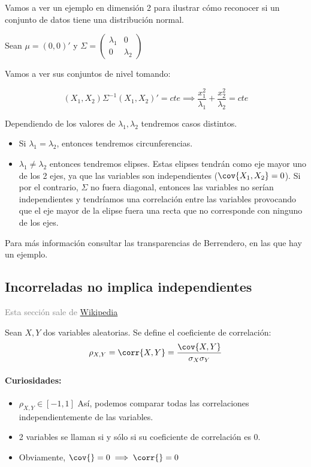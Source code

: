 \begin{example}
Vamos a ver un ejemplo en dimensión 2 para ilustrar cómo reconocer si un conjunto de datos tiene una distribución normal.

Sean $μ = (0,0)'$ y $Σ = \begin{pmatrix} λ_1 & 0 \\ 0 & λ_2 \end{pmatrix}$

Vamos a ver sus conjuntos de nivel tomando:

\[(X_1,X_2) Σ^{-1} (X_1,X_2)' = cte \implies \frac{x_1^2}{λ_1} + \frac{x_2^2}{λ_2} = cte\]


Dependiendo de los valores de $λ_1,λ_2$ tendremos casos distintos.

\begin{itemize}
	\item Si $λ_1 = λ_2$, entonces tendremos circunferencias.
	\item $λ_1 ≠ λ_2$ entonces tendremos elipses.
	\subitem
	Estas elipses tendrán como eje mayor uno de los 2 ejes, ya que las variables son independientes ($\cov{X_1,X_2} = 0$).
	\subitem Si por el contrario, $Σ$ no fuera diagonal, entonces las variables no serían independientes y tendríamos una correlación entre las variables provocando que el eje mayor de la elipse fuera una recta que no corresponde con ninguno de los ejes.
\end{itemize}


Para más información consultar las transparencias de Berrendero, en las que hay un ejemplo.

\end{example}


\subsection{Incorreladas no implica independientes}
\label{sec:incorrnotindep}
\textcolor{grey}{Esta sección sale de \href{https://en.wikipedia.org/wiki/Normally_distributed_and_uncorrelated_does_not_imply_independent}{Wikipedia}}


\begin{defn}[Correlación]
Sean $X,Y$ dos variables aleatorias. Se define el coeficiente de correlación:
\[\rho_{X,Y}=\corr{X,Y}={\cov{X,Y} \over \sigma_X \sigma_Y}\]

\paragraph{Curiosidades:}

\begin{itemize}
	\item $\rho_{X,Y} ∈ [-1,1]$ Así, podemos comparar todas las correlaciones independientemente de las variables.
	\item 2 variables se llaman  si y sólo si su coeficiente de correlación es $0$.
	\item Obviamente, $\cov{} = 0 \implies \corr{} = 0$
\end{itemize}
\end{defn}


